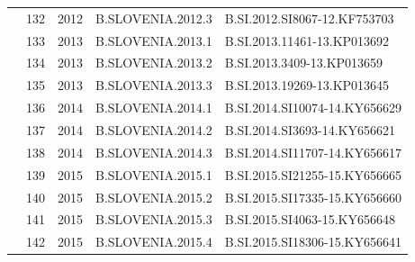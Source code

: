 \begin{table}[htbp]
\begin{tabular}{|cllll|}
\multicolumn{1}{|c|}{}                                    & \multicolumn{1}{l|}{132}         & \multicolumn{1}{l|}{2012}          & \multicolumn{1}{l|}{B.SLOVENIA.2012.3}  & B.SI.2012.SI8067-12.KF753703    \\ \cline{2-5} 
\multicolumn{1}{|c|}{}                                    & \multicolumn{1}{l|}{133}         & \multicolumn{1}{l|}{2013}          & \multicolumn{1}{l|}{B.SLOVENIA.2013.1}  & B.SI.2013.11461-13.KP013692     \\ \cline{2-5} 
\multicolumn{1}{|c|}{}                                    & \multicolumn{1}{l|}{134}         & \multicolumn{1}{l|}{2013}          & \multicolumn{1}{l|}{B.SLOVENIA.2013.2}  & B.SI.2013.3409-13.KP013659      \\ \cline{2-5} 
\multicolumn{1}{|c|}{}                                    & \multicolumn{1}{l|}{135}         & \multicolumn{1}{l|}{2013}          & \multicolumn{1}{l|}{B.SLOVENIA.2013.3}  & B.SI.2013.19269-13.KP013645     \\ \cline{2-5} 
\multicolumn{1}{|c|}{}                                    & \multicolumn{1}{l|}{136}         & \multicolumn{1}{l|}{2014}          & \multicolumn{1}{l|}{B.SLOVENIA.2014.1}  & B.SI.2014.SI10074-14.KY656629   \\ \cline{2-5} 
\multicolumn{1}{|c|}{}                                    & \multicolumn{1}{l|}{137}         & \multicolumn{1}{l|}{2014}          & \multicolumn{1}{l|}{B.SLOVENIA.2014.2}  & B.SI.2014.SI3693-14.KY656621    \\ \cline{2-5} 
\multicolumn{1}{|c|}{}                                    & \multicolumn{1}{l|}{138}         & \multicolumn{1}{l|}{2014}          & \multicolumn{1}{l|}{B.SLOVENIA.2014.3}  & B.SI.2014.SI11707-14.KY656617   \\ \cline{2-5} 
\multicolumn{1}{|c|}{}                                    & \multicolumn{1}{l|}{139}         & \multicolumn{1}{l|}{2015}          & \multicolumn{1}{l|}{B.SLOVENIA.2015.1}  & B.SI.2015.SI21255-15.KY656665   \\ \cline{2-5} 
\multicolumn{1}{|c|}{}                                    & \multicolumn{1}{l|}{140}         & \multicolumn{1}{l|}{2015}          & \multicolumn{1}{l|}{B.SLOVENIA.2015.2}  & B.SI.2015.SI17335-15.KY656660   \\ \cline{2-5} 
\multicolumn{1}{|c|}{}                                    & \multicolumn{1}{l|}{141}         & \multicolumn{1}{l|}{2015}          & \multicolumn{1}{l|}{B.SLOVENIA.2015.3}  & B.SI.2015.SI4063-15.KY656648    \\ \cline{2-5} 
\multicolumn{1}{|c|}{}                                    & \multicolumn{1}{l|}{142}         & \multicolumn{1}{l|}{2015}          & \multicolumn{1}{l|}{B.SLOVENIA.2015.4}  & B.SI.2015.SI18306-15.KY656641   \\ \hline
\end{tabular}
\end{table}


